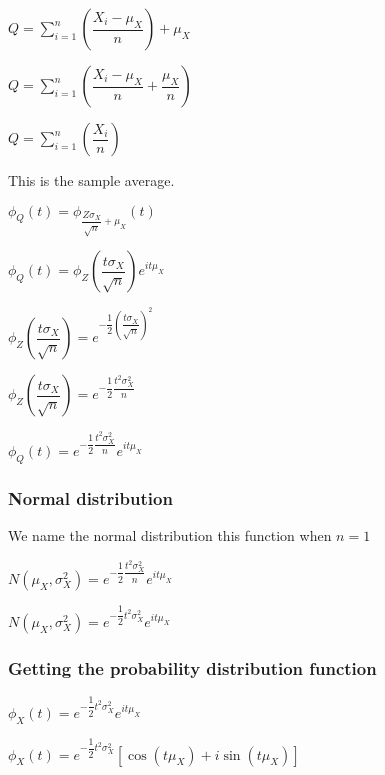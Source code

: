 \(Q=\sum_{i=1}^n(\dfrac{X_i-\mu_X }{n})+\mu_X\)

\(Q=\sum_{i=1}^n(\dfrac{X_i-\mu_X }{n}+\dfrac{\mu_X}{n})\)

\(Q=\sum_{i=1}^n(\dfrac{X_i}{n})\)

This is the sample average.

\(\phi_Q(t)=\phi_{\dfrac{Z\sigma_X }{\sqrt n}+\mu_X}(t)\)

\(\phi_Q(t)=\phi_Z(\dfrac{t\sigma_X }{\sqrt n})e^{it\mu_X}\)

\(\phi_Z(\dfrac{t\sigma_X }{\sqrt n})=e^{-\dfrac{1}{2}(\dfrac{t\sigma_X }{\sqrt n})^2}\)

\(\phi_Z(\dfrac{t\sigma_X }{\sqrt n})=e^{-\dfrac{1}{2}\dfrac{t^2\sigma^2_X }{n}}\)

\(\phi_Q(t)=e^{-\dfrac{1}{2}\dfrac{t^2\sigma^2_X }{n}}e^{it\mu_X}\)

\subsubsection{Normal distribution}

We name the normal distribution this function when \(n=1\)

\(N(\mu_X, \sigma^2_X)=e^{-\dfrac{1}{2}\dfrac{t^2\sigma^2_X }{n}}e^{it\mu_X}\)

\(N(\mu_X, \sigma^2_X)=e^{-\dfrac{1}{2}t^2\sigma^2_X }e^{it\mu_X}\)

\subsubsection{Getting the probability distribution function}

\(\phi_X(t)=e^{-\dfrac{1}{2}t^2\sigma^2_X} e^{it\mu_X}\)

\(\phi_X(t)=e^{-\dfrac{1}{2}t^2\sigma^2_X}[\cos (t\mu_X )+i\sin (t\mu_X)]\)

